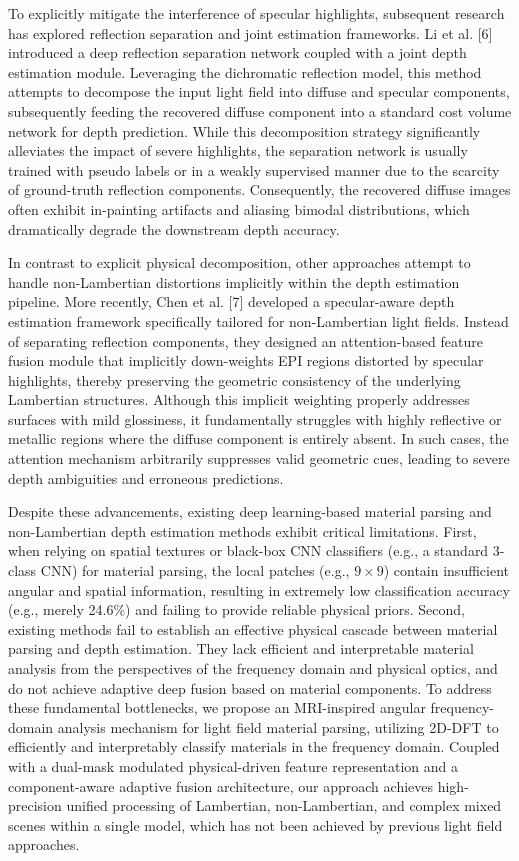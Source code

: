 To explicitly mitigate the interference of specular highlights, subsequent research has explored reflection separation and joint estimation frameworks. Li et al. [6] introduced a deep reflection separation network coupled with a joint depth estimation module. Leveraging the dichromatic reflection model, this method attempts to decompose the input light field into diffuse and specular components, subsequently feeding the recovered diffuse component into a standard cost volume network for depth prediction. While this decomposition strategy significantly alleviates the impact of severe highlights, the separation network is usually trained with pseudo labels or in a weakly supervised manner due to the scarcity of ground-truth reflection components. Consequently, the recovered diffuse images often exhibit in-painting artifacts and aliasing bimodal distributions, which dramatically degrade the downstream depth accuracy.

In contrast to explicit physical decomposition, other approaches attempt to handle non-Lambertian distortions implicitly within the depth estimation pipeline. More recently, Chen et al. [7] developed a specular-aware depth estimation framework specifically tailored for non-Lambertian light fields. Instead of separating reflection components, they designed an attention-based feature fusion module that implicitly down-weights EPI regions distorted by specular highlights, thereby preserving the geometric consistency of the underlying Lambertian structures. Although this implicit weighting properly addresses surfaces with mild glossiness, it fundamentally struggles with highly reflective or metallic regions where the diffuse component is entirely absent. In such cases, the attention mechanism arbitrarily suppresses valid geometric cues, leading to severe depth ambiguities and erroneous predictions.

Despite these advancements, existing deep learning-based material parsing and non-Lambertian depth estimation methods exhibit critical limitations. First, when relying on spatial textures or black-box CNN classifiers (e.g., a standard 3-class CNN) for material parsing, the local patches (e.g., $9 \times 9$) contain insufficient angular and spatial information, resulting in extremely low classification accuracy (e.g., merely 24.6\%) and failing to provide reliable physical priors. Second, existing methods fail to establish an effective physical cascade between material parsing and depth estimation. They lack efficient and interpretable material analysis from the perspectives of the frequency domain and physical optics, and do not achieve adaptive deep fusion based on material components. To address these fundamental bottlenecks, we propose an MRI-inspired angular frequency-domain analysis mechanism for light field material parsing, utilizing 2D-DFT to efficiently and interpretably classify materials in the frequency domain. Coupled with a dual-mask modulated physical-driven feature representation and a component-aware adaptive fusion architecture, our approach achieves high-precision unified processing of Lambertian, non-Lambertian, and complex mixed scenes within a single model, which has not been achieved by previous light field approaches.

